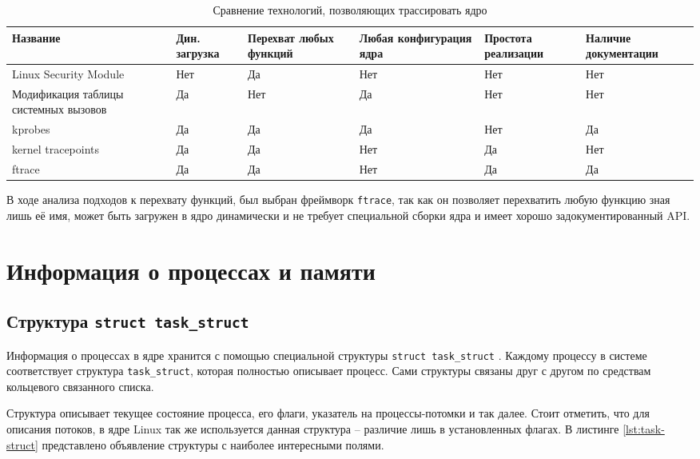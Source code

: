 \begin{table}[h]
	\centering
	\label{tab:analyze}
	\begin{tabular}{ | p{3cm} | p{2cm} | p{2cm} | p{2cm} | p{2cm} | p{2cm} | }
		\hline
		Название & Дин. загрузка & Перехват любых функций & Любая конфигурация ядра & Простота реализации & Наличие документации \\
		\hline
		Linux Security Module & Нет & Да & Нет & Нет & Нет \\
		\hline
		Модификация таблицы системных вызовов & Да & Нет & Да & Нет & Нет \\
		\hline
		kprobes & Да & Да & Да & Нет & Да \\
		\hline
		kernel tracepoints & Да & Да & Нет & Да & Нет \\
		\hline
		ftrace & Да & Да & Нет & Да & Да \\
		\hline
	\end{tabular}
	\caption{Сравнение технологий, позволяющих трассировать ядро}
\end{table}

В ходе анализа подходов к перехвату функций, был выбран фреймворк \texttt{ftrace}, так как он позволяет перехватить любую функцию зная лишь её имя, может быть загружен в ядро динамически и не требует специальной сборки ядра и имеет хорошо задокументированный API.

\section{Информация о процессах и памяти}

\subsection{Структура \texttt{struct task\_struct}}

Информация о процессах в ядре хранится с помощью специальной структуры \texttt{struct task\_struct} \cite{task-struct}. Каждому процессу в системе соответствует структура \texttt{task\_struct}, которая полностью описывает процесс. Сами структуры связаны друг с другом по средствам кольцевого связанного списка. 

Структура описывает текущее состояние процесса, его флаги, указатель на процессы-потомки и так далее. Стоит отметить, что для описания потоков, в ядре Linux так же используется данная структура -- различие лишь в установленных флагах. В листинге \ref{lst:task-struct} представлено объявление структуры с наиболее интересными полями.\\

